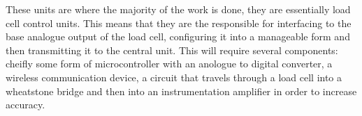 These units are where the majority of the work is done, they are essentially load cell control units. This means that they are the responsible for interfacing to the base analogue output of the load cell, configuring it into a manageable form and then transmitting it to the central unit. This will require several components: cheifly some form of microcontroller with an anologue to digital converter, a wireless communication device, a circuit that travels through a load cell into a wheatstone bridge and then into an instrumentation amplifier in order to increase accuracy. 